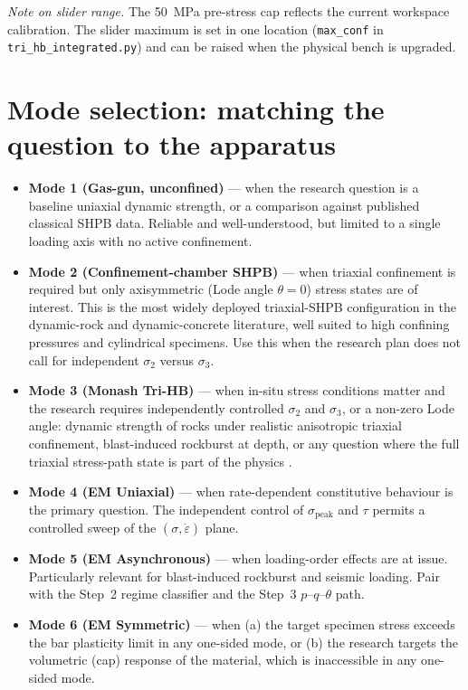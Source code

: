 \documentclass[11pt,a4paper,openany]{book}
\providecommand{\SI}[2]{\qty{#1}{#2}}
\theoremstyle{handbook}
\newcommand{\sig}{\sigma}
\newcommand{\eps}{\varepsilon}
\newcommand{\epsdot}{\dot\eps}
\newcommand{\sigpeak}{\sig_{\text{peak}}}
\begin{document}
\noindent\textit{Note on slider range.} The \SI{50}{MPa} pre-stress cap
reflects the current workspace calibration. The slider maximum is set in
one location (\texttt{max\_conf} in \texttt{tri\_hb\_integrated.py}) and can
be raised when the physical bench is upgraded.

\section{Mode selection: matching the question to the apparatus}

\begin{itemize}[leftmargin=*,itemsep=3pt]
  \item \textbf{Mode 1 (Gas-gun, unconfined)} --- when the research question
        is a baseline uniaxial dynamic strength, or a comparison against
        published classical SHPB data. Reliable and well-understood, but
        limited to a single loading axis with no active confinement.
  \item \textbf{Mode 2 (Confinement-chamber SHPB)} --- when triaxial
        confinement is required but only axisymmetric (Lode angle
        $\theta=0$) stress states are of interest. This is the most
        widely deployed triaxial-SHPB configuration in the dynamic-rock
        and dynamic-concrete literature, well suited to high confining
        pressures and cylindrical specimens. Use this when the research
        plan does not call for independent $\sig_2$ versus $\sig_3$.
  \item \textbf{Mode 3 (Monash Tri-HB)} --- when in-situ stress conditions
        matter and the research requires independently controlled $\sig_2$
        and $\sig_3$, or a non-zero Lode angle: dynamic strength of rocks
        under realistic anisotropic triaxial confinement, blast-induced
        rockburst at depth, or any question where the full triaxial
        stress-path state is part of the physics
        \cite{Liu2019,Zhang2019Tri}.
  \item \textbf{Mode 4 (EM Uniaxial)} --- when rate-dependent constitutive
        behaviour is the primary question. The independent control of
        $\sigpeak$ and $\tau$ permits a controlled sweep of the
        $(\sig,\epsdot)$ plane.
  \item \textbf{Mode 5 (EM Asynchronous)} --- when loading-order effects
        are at issue. Particularly relevant for blast-induced rockburst
        and seismic loading. Pair with the Step~2 regime classifier and
        the Step~3 $p$--$q$--$\theta$ path.
  \item \textbf{Mode 6 (EM Symmetric)} --- when (a) the target specimen
        stress exceeds the bar plasticity limit in any one-sided mode, or
        (b) the research targets the volumetric (cap) response of the
        material, which is inaccessible in any one-sided mode.
\end{itemize}
\end{document}
